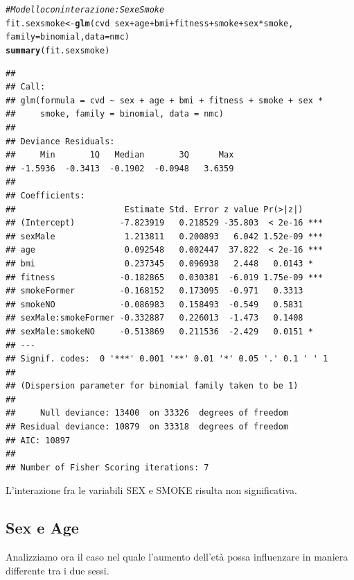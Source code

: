 \documentclass{article}\usepackage[]{graphicx}\usepackage[]{xcolor}
\makeatletter
\newcommand{\hlcom}[1]{\textcolor[rgb]{0.678,0.584,0.686}{\textit{#1}}}%
\newcommand{\hlopt}[1]{\textcolor[rgb]{0,0,0}{#1}}%
\newcommand{\hlstd}[1]{\textcolor[rgb]{0.345,0.345,0.345}{#1}}%
\newcommand{\hlkwb}[1]{\textcolor[rgb]{0.69,0.353,0.396}{#1}}%
\newcommand{\hlkwc}[1]{\textcolor[rgb]{0.333,0.667,0.333}{#1}}%
\newcommand{\hlkwd}[1]{\textcolor[rgb]{0.737,0.353,0.396}{\textbf{#1}}}%
\newenvironment{kframe}{%
 \def\at@end@of@kframe{}%
 \ifinner\ifhmode%
  \def\at@end@of@kframe{\end{minipage}}%
  \begin{minipage}{\columnwidth}%
 \fi\fi%
 \def\FrameCommand##1{\hskip\@totalleftmargin \hskip-\fboxsep
 \colorbox{shadecolor}{##1}\hskip-\fboxsep
     \hskip-\linewidth \hskip-\@totalleftmargin \hskip\columnwidth}%
 \MakeFramed {\advance\hsize-\width
   \@totalleftmargin\z@ \linewidth\hsize
   \@setminipage}}%
 {\par\unskip\endMakeFramed%
 \at@end@of@kframe}
\newenvironment{knitrout}{}{} %
\makeatother
\begin{document}
\begin{knitrout}
\color{fgcolor}\begin{kframe}
\begin{alltt}
\hlcom{#Modello con interazione: Sex e Smoke}
\hlstd{fit.sexsmoke} \hlkwb{<-} \hlkwd{glm}\hlstd{(cvd}\hlopt{~}\hlstd{sex}\hlopt{+}\hlstd{age}\hlopt{+}\hlstd{bmi}\hlopt{+}\hlstd{fitness}\hlopt{+}\hlstd{smoke}\hlopt{+}\hlstd{sex}\hlopt{*}\hlstd{smoke,}
                    \hlkwc{family}\hlstd{=binomial,} \hlkwc{data}\hlstd{=nmc)}
\hlkwd{summary}\hlstd{(fit.sexsmoke)}
\end{alltt}
\begin{verbatim}
## 
## Call:
## glm(formula = cvd ~ sex + age + bmi + fitness + smoke + sex * 
##     smoke, family = binomial, data = nmc)
## 
## Deviance Residuals: 
##     Min       1Q   Median       3Q      Max  
## -1.5936  -0.3413  -0.1902  -0.0948   3.6359  
## 
## Coefficients:
##                      Estimate Std. Error z value Pr(>|z|)    
## (Intercept)         -7.823919   0.218529 -35.803  < 2e-16 ***
## sexMale              1.213811   0.200893   6.042 1.52e-09 ***
## age                  0.092548   0.002447  37.822  < 2e-16 ***
## bmi                  0.237345   0.096938   2.448   0.0143 *  
## fitness             -0.182865   0.030381  -6.019 1.75e-09 ***
## smokeFormer         -0.168152   0.173095  -0.971   0.3313    
## smokeNO             -0.086983   0.158493  -0.549   0.5831    
## sexMale:smokeFormer -0.332887   0.226013  -1.473   0.1408    
## sexMale:smokeNO     -0.513869   0.211536  -2.429   0.0151 *  
## ---
## Signif. codes:  0 '***' 0.001 '**' 0.01 '*' 0.05 '.' 0.1 ' ' 1
## 
## (Dispersion parameter for binomial family taken to be 1)
## 
##     Null deviance: 13400  on 33326  degrees of freedom
## Residual deviance: 10879  on 33318  degrees of freedom
## AIC: 10897
## 
## Number of Fisher Scoring iterations: 7
\end{verbatim}
\end{kframe}
\end{knitrout}
    
    L'interazione fra le variabili SEX e SMOKE risulta non significativa.
    
  \subsection{Sex e Age}
    Analizziamo ora il caso nel quale l'aumento dell'età possa influenzare in
    maniera differente tra i due sessi.
    
\end{document}
